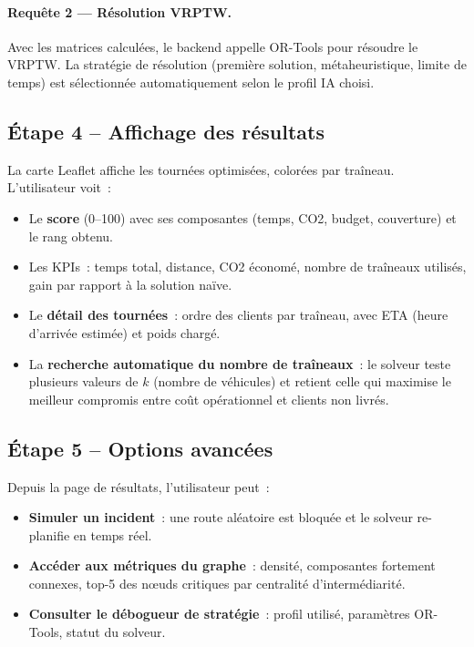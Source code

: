 \documentclass[a4paper, 12pt, twoside]{article}
\begin{document}
\paragraph{Requ\^{e}te 2 --- R\'{e}solution VRPTW.}
Avec les matrices calcul\'{e}es, le backend appelle OR-Tools pour r\'{e}soudre le VRPTW. La
strat\'{e}gie de r\'{e}solution (premi\`{e}re solution, m\'{e}taheuristique, limite de temps) est
s\'{e}lectionn\'{e}e automatiquement selon le profil IA choisi.

\subsection{\'{E}tape 4 -- Affichage des r\'{e}sultats}

La carte Leaflet affiche les tourn\'{e}es optimis\'{e}es, color\'{e}es par tra\^{i}neau. L'utilisateur
voit~:
\begin{itemize}
  \item Le \textbf{score} (0--100) avec ses composantes (temps, CO2, budget, couverture) et
        le rang obtenu.
  \item Les KPIs~: temps total, distance, CO2 \'{e}conom\'{e}, nombre de tra\^{i}neaux utilis\'{e}s,
        gain par rapport \`{a} la solution na\"ive.
  \item Le \textbf{d\'{e}tail des tourn\'{e}es}~: ordre des clients par tra\^{i}neau, avec ETA
        (heure d'arriv\'{e}e estim\'{e}e) et poids charg\'{e}.
  \item La \textbf{recherche automatique du nombre de tra\^{i}neaux}~: le solveur teste
        plusieurs valeurs de $k$ (nombre de v\'{e}hicules) et retient celle qui maximise
        le meilleur compromis entre co\^{u}t op\'{e}rationnel et clients non livr\'{e}s.
\end{itemize}

\subsection{\'{E}tape 5 -- Options avanc\'{e}es}

Depuis la page de r\'{e}sultats, l'utilisateur peut~:
\begin{itemize}
  \item \textbf{Simuler un incident}~: une route al\'{e}atoire est bloqu\'{e}e et le solveur
        re-planifie en temps r\'{e}el.
  \item \textbf{Acc\'{e}der aux m\'{e}triques du graphe}~: densit\'{e}, composantes fortement
        connexes, top-5 des n\oe uds critiques par centralit\'{e} d'interm\'{e}diarit\'{e}.
  \item \textbf{Consulter le d\'{e}bogueur de strat\'{e}gie}~: profil utilis\'{e}, param\`{e}tres
        OR-Tools, statut du solveur.
\end{itemize}
\end{document}
